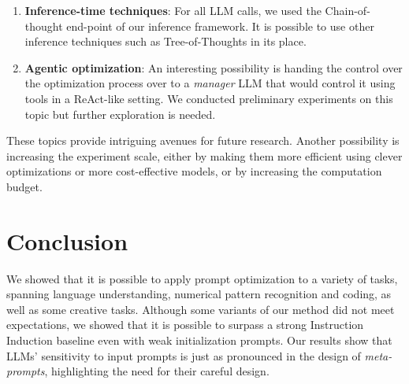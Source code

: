\begin{enumerate}
    \item \textbf{Inference-time techniques}: For all LLM calls, we used the Chain-of-thought end-point of our inference framework. It is possible to use other inference techniques such as Tree-of-Thoughts in its place.
    \item \textbf{Agentic optimization}: An interesting possibility is handing the control over the optimization process over to a \textit{manager} LLM that would control it using tools in a ReAct-like setting. We conducted preliminary experiments on this topic but further exploration is needed. 
\end{enumerate}

These topics provide intriguing avenues for future research. Another possibility is increasing the experiment scale, either by making them more efficient
using clever optimizations or more cost-effective models, or by increasing the computation budget. 

\section{Conclusion}
We showed that it is possible to apply prompt optimization to a variety of tasks, spanning language understanding, numerical pattern recognition and coding, as well as some creative tasks.
Although some variants of our method did not meet expectations, we showed that it is possible to surpass a strong Instruction Induction baseline even with weak initialization prompts. 
Our results show that LLMs' sensitivity to input prompts is just as pronounced in the design of \textit{meta-prompts}, highlighting the need for their careful design.
